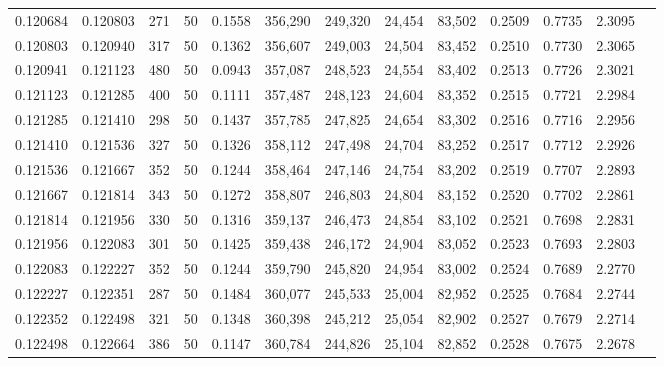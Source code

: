 \begin{tabular}{rrrrrrrrrrrrr}
0.120684 & 0.120803 &   271 &  50 &                                     0.1558 & 356,290 & 249,320 &  24,454 &  83,502 & 0.2509 & 0.7735 & 2.3095 \\
0.120803 & 0.120940 &   317 &  50 &                                     0.1362 & 356,607 & 249,003 &  24,504 &  83,452 & 0.2510 & 0.7730 & 2.3065 \\
0.120941 & 0.121123 &   480 &  50 &                                     0.0943 & 357,087 & 248,523 &  24,554 &  83,402 & 0.2513 & 0.7726 & 2.3021 \\
0.121123 & 0.121285 &   400 &  50 &                                     0.1111 & 357,487 & 248,123 &  24,604 &  83,352 & 0.2515 & 0.7721 & 2.2984 \\
0.121285 & 0.121410 &   298 &  50 &                                     0.1437 & 357,785 & 247,825 &  24,654 &  83,302 & 0.2516 & 0.7716 & 2.2956 \\
0.121410 & 0.121536 &   327 &  50 &                                     0.1326 & 358,112 & 247,498 &  24,704 &  83,252 & 0.2517 & 0.7712 & 2.2926 \\
0.121536 & 0.121667 &   352 &  50 &                                     0.1244 & 358,464 & 247,146 &  24,754 &  83,202 & 0.2519 & 0.7707 & 2.2893 \\
0.121667 & 0.121814 &   343 &  50 &                                     0.1272 & 358,807 & 246,803 &  24,804 &  83,152 & 0.2520 & 0.7702 & 2.2861 \\
0.121814 & 0.121956 &   330 &  50 &                                     0.1316 & 359,137 & 246,473 &  24,854 &  83,102 & 0.2521 & 0.7698 & 2.2831 \\
0.121956 & 0.122083 &   301 &  50 &                                     0.1425 & 359,438 & 246,172 &  24,904 &  83,052 & 0.2523 & 0.7693 & 2.2803 \\
0.122083 & 0.122227 &   352 &  50 &                                     0.1244 & 359,790 & 245,820 &  24,954 &  83,002 & 0.2524 & 0.7689 & 2.2770 \\
0.122227 & 0.122351 &   287 &  50 &                                     0.1484 & 360,077 & 245,533 &  25,004 &  82,952 & 0.2525 & 0.7684 & 2.2744 \\
0.122352 & 0.122498 &   321 &  50 &                                     0.1348 & 360,398 & 245,212 &  25,054 &  82,902 & 0.2527 & 0.7679 & 2.2714 \\
0.122498 & 0.122664 &   386 &  50 &                                     0.1147 & 360,784 & 244,826 &  25,104 &  82,852 & 0.2528 & 0.7675 & 2.2678 \\

\end{tabular}
